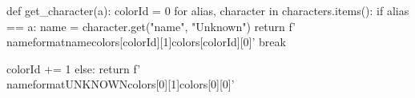\newcommand{\characterLine}[3]{%
    \begin{tblr}{ X[3,r] X[1,c] X[9,l] }
        \textbf{#1} & \underline{\textit{#2}} & #3 \\ %
    \end{tblr}
}

\newcommand{\newpart}{%
    \noindent\makebox[\linewidth]{\rule{\maxdimen}{0.2pt}} \\[5mm]
}

\newcommand{\nameformat}[3]{%
    \textcolor[HTML]{#3}{\colorbox[HTML]{#2}{#1}}
}


\begin{pycode}
def get_character(a):
    colorId = 0
    for alias, character in characters.items():
        if alias == a:
            name = character.get("name", "Unknown")
            return f'\\nameformat{{{name}}}{{{colors[colorId][1]}}}{{{colors[colorId][0]}}}'
            break

        colorId += 1
    else:
        return f'\\nameformat{{UNKNOWN}}{{{colors[0][1]}}}{{{colors[0][0]}}}'
\end{pycode}

\newcommand{\postava}[1]{
    \pyc{%
    print(get_character("#1"))
    }
}